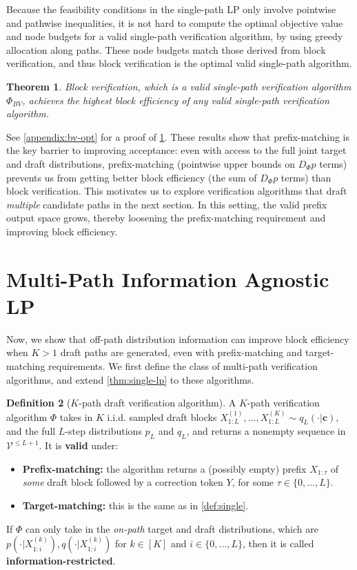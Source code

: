 \documentclass{article}
\theoremstyle{plain}
\newtheorem{theorem}{Theorem}[section]
\theoremstyle{definition}
\newtheorem{definition}[theorem]{Definition}
\theoremstyle{remark}
\newcommand{\V}{\mathcal{V}}
\begin{document}
Because the feasibility conditions in the single-path LP only involve pointwise and pathwise inequalities, it is not hard to compute the optimal objective value and node budgets for a valid single-path verification algorithm, by using greedy allocation along paths. These node budgets match those derived from block verification, and thus block verification is the optimal valid single-path algorithm. 

\begin{theorem}
    Block verification, which is a valid single-path verification algorithm $\Phi_{BV}$, achieves the highest block efficiency of any valid single-path verification algorithm.
    \label{thm:bv-opt}
\end{theorem}


See \cref{appendix:bv-opt} for a proof of \cref{thm:bv-opt}. These results show that prefix-matching is the key barrier to improving acceptance: even with access to the full joint target and draft distributions, prefix-matching (pointwise upper bounds on $D_\Phi p$ terms) prevents us from getting better block efficiency (the sum of $D_\Phi p$ terms) than block verification. This motivates us to explore verification algorithms that draft \textit{multiple} candidate paths in the next section. In this setting, the valid prefix output space grows, thereby loosening the prefix-matching requirement and improving block efficiency.

\section{Multi-Path Information Agnostic LP}

Now, we show that off-path distribution information can improve block efficiency when $K>1$ draft paths are generated, even with prefix-matching and target-matching requirements. We first define the class of multi-path verification algorithms, and extend \cref{thm:single-lp} to these algorithms.

\begin{definition}[$K$-path draft verification algorithm] A $K$-path verification algorithm $\Phi$ takes in $K$ i.i.d. sampled draft blocks $X^{(1)}_{1:L},\ldots,X^{(K)}_{1:L} \sim q_L(\cdot|\boldsymbol{c})$, and the full $L$-step distributions $p_L$ and $q_L$, and returns a nonempty sequence in $\V^{\leq L+1}$. It is \textbf{valid} under:
\begin{itemize}
    \item \textbf{Prefix-matching:} the algorithm returns a (possibly empty) prefix $X_{1:\tau}$ of \textit{some} draft block followed by a correction token $Y$, for some $\tau \in \{0,\ldots,L\}$.
    \item \textbf{Target-matching:} this is the same as in \cref{def:single}.
\end{itemize}
If $\Phi$ can only take in the \emph{on-path} target and draft distributions, which are $p(\cdot|X^{(k)}_{1:i}),q(\cdot|X^{(k)}_{1:i})$ for $k\in [K]$ and $i \in \{0,\ldots,L\}$, then it is called \textbf{information-restricted}.
\end{definition}
\end{document}
